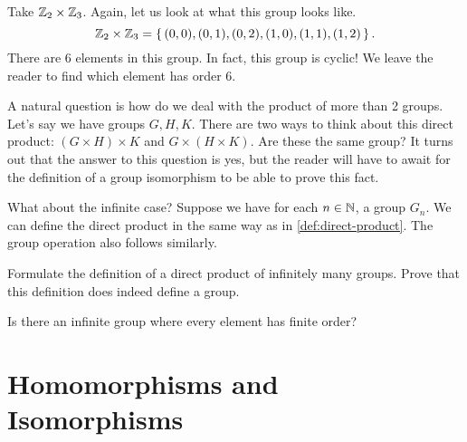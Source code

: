 \documentclass[./main.tex]{subfiles}
\begin{document}
\begin{example}
    Take $\mathbb{Z}_2 \times \mathbb{Z}_3$. Again, let us look at what this group looks like.
    \[
        \mathbb{Z}_2 \times \mathbb{Z}_3 = \set{(0,0), (0,1), (0,2), (1,0), (1,1), (1,2)}.
    \]
    There are 6 elements in this group. In fact, this group is cyclic! We leave
    the reader to find which element has order 6.
\end{example}

A natural question is how do we deal with the product of more than 2 groups.
Let's say we have groups $G, H, K$. There are two ways to think about this
direct product: $(G \times H) \times K$ and $G \times (H \times K)$. Are these
the same group? It turns out that the answer to this question is yes, but the
reader will have to await for the definition of a group isomorphism to be able
to prove this fact.

What about the infinite case? Suppose we have for each $n \in \mathbb{N}$, a group
$G_n$. We can define the direct product in the same way as in
\cref{def:direct-product}. The group operation also follows similarly.

\begin{exercise}
    Formulate the definition of a direct product of infinitely many groups.
    Prove that this definition does indeed define a group.
\end{exercise}

\begin{exercise}
    Is there an infinite group where every element has finite order?
\end{exercise}

\section{Homomorphisms and Isomorphisms}

\end{document}
